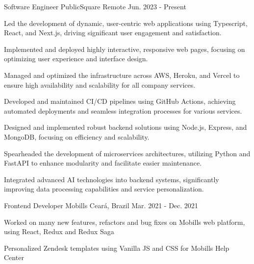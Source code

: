 

\begin{cventries}

\cventry
{Software Engineer} %
{PublicSquare} %
{Remote} %
{Jun. 2023 - Present} %
{
  \begin{cvitems} %
    \item{Led the development of dynamic, user-centric web applications using Typescript, React, and Next.js, driving significant user engagement and satisfaction.}
    \item{Implemented and deployed highly interactive, responsive web pages, focusing on optimizing user experience and interface design.}
    \item {Managed and optimized the infrastructure across AWS, Heroku, and Vercel to ensure high availability and scalability for all company services.}
    \item{Developed and maintained CI/CD pipelines using GitHub Actions, achieving automated deployments and seamless integration processes for various services.}
    \item{Designed and implemented robust backend solutions using Node.js, Express, and MongoDB, focusing on efficiency and scalability.}
    \item{Spearheaded the development of microservices architectures, utilizing Python and FastAPI to enhance modularity and facilitate easier maintenance.}
    \item{Integrated advanced AI technologies into backend systems, significantly improving data processing capabilities and service personalization.}
  \end{cvitems}
}

\cventry
{Frontend Developer} %
{Mobills} %
{Ceará, Brazil} %
{Mar. 2021 - Dec. 2021} %
{
  \begin{cvitems} %
    \item {Worked on many new features,
    refactors and bug fixes on Mobills
    web platform, using React, Redux
    and Redux Saga}
    \item {Personalized Zendesk templates
    using Vanilla JS and CSS for
    Mobills Help Center}
  \end{cvitems}
}


\end{cventries}
